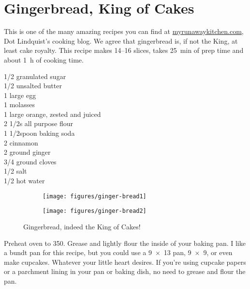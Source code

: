 \section{Gingerbread, King of Cakes}

\begin{open}
    This is one of the many amazing recipes you can find at
    \url{myrunawaykitchen.com}, Dot Lindquist's cooking blog.  We agree that
    gingerbread is, if not the King, at least cake royalty.  This recipe makes
    \numrange{14}{16} slices, takes \SI{25}{\minute} of prep time and about
    \SI{1}{\hour} of cooking time.
\end{open}
\begin{ingredients}
    \SI{1/2}{\cup}  granulated sugar\\
    \SI{1/2}{\cup}  unsalted butter\\
    1 large egg\\
    \SI{1}{\cup} molasses\\
    1 large orange, zested and juiced\\
    2 \SI{1/2}{\cup}s  all purpose flour\\
    1 \SI{1/2}{\cup}spoon  baking soda\\
    \SI{2}{\teaspoon} cinnamon\\
    \SI{2}{\teaspoon} ground ginger\\
    \SI{3/4}{\teaspoon}   ground cloves\\
    \SI{1/2}{\teaspoon}  salt\\
    \SI{1/2}{\cup}  hot water
\end{ingredients}
\begin{figure}
    \centering
    \begin{subfigure}{0.6\textwidth}
        \centering
        \texttt{[image: figures/ginger-bread1]}
    \end{subfigure}
    \begin{subfigure}{0.34\textwidth}
        \centering
        \texttt{[image: figures/ginger-bread2]}
    \end{subfigure}
    \caption*{Gingerbread, indeed the King of Cakes!}
\end{figure}
Preheat oven to \SI{350}{\degreeF}. Grease and lightly flour the inside of your
baking pan. I like a bundt pan for this recipe, but you could use a
\SI{9x13}{\inch} pan, \SI{9x9}{\inch}, or even make cupcakes. Whatever your
little heart desires. If you're using cupcake papers or a parchment lining in
your pan or baking dish, no need to grease and flour the pan.

